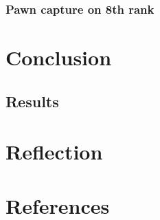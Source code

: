 \documentclass[11pt]{article}
\begin{document}
\subsubsection{Pawn capture on 8th rank}
\label{sec:org6cb3601}
\section{Conclusion}
\label{sec:org60039ac}
\subsection{Results}
\label{sec:orgb2f5817}
\section{Reflection}
\label{sec:orga8e2a4c}
\section{References}
\label{sec:org888c3a9}
\end{document}
